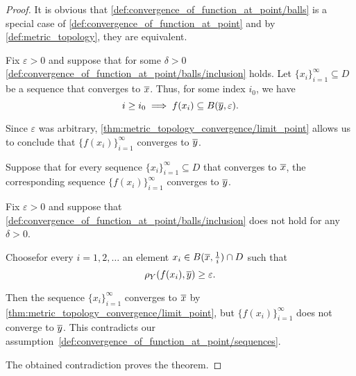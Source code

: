 \begin{proof}
  It is obvious that \cref{def:convergence_of_function_at_point/balls} is a special case of \cref{def:convergence_of_function_at_point} and by \cref{def:metric_topology}, they are equivalent.

   Fix \( \varepsilon > 0 \) and suppose that for some \( \delta > 0 \) \cref{def:convergence_of_function_at_point/balls/inclusion} holds. Let \( \{ x_i \}_{i=1}^\infty \subseteq D \) be a sequence that converges to \( \overline{x} \). Thus, for some index \( i_0 \), we have
  \begin{equation*}
    i \geq i_0 \implies f(x_i) \subseteq B(\overline{y}, \varepsilon).
  \end{equation*}

   Since \( \varepsilon \) was arbitrary, \cref{thm:metric_topology_convergence/limit_point} allows us to conclude that \( \{ f(x_i) \}_{i=1}^\infty \) converges to \( \overline{y} \).

    Suppose that for every sequence \( \{ x_i \}_{i=1}^\infty \subseteq D \) that converges to \( \overline{x} \), the corresponding sequence \( \{ f(x_i) \}_{i=1}^\infty \) converges to \( \overline{y} \).

   Fix \( \varepsilon > 0 \) and suppose that \cref{def:convergence_of_function_at_point/balls/inclusion} does not hold for any \( \delta > 0 \).

   Choose\AOC for every \( i = 1, 2, \ldots \) an element \( x_i \in B(\overline{x}, \tfrac 1 i) \cap D \) such that
   \begin{equation*}
     \rho_Y(f(x_i), \overline{y}) \geq \varepsilon.
   \end{equation*}

   Then the sequence \( \{ x_i \}_{i=1}^\infty \) converges to \( \overline{x} \) by \cref{thm:metric_topology_convergence/limit_point}, but \(\{ f(x_i) \}_{i=1}^\infty \) does not converge to \( \overline{y} \). This contradicts our assumption~\ref{def:convergence_of_function_at_point/sequences}.

   The obtained contradiction proves the theorem.
\end{proof}

